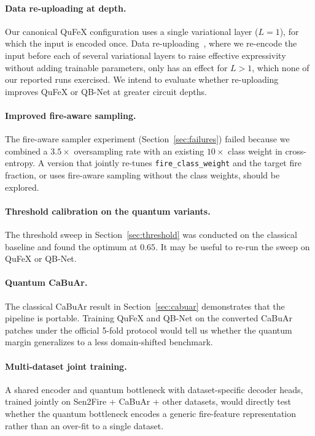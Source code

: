\documentclass{article}
\begin{document}
\paragraph{Data re-uploading at depth.} Our canonical QuFeX configuration uses a single variational layer ($L=1$), for which the input is encoded once. Data re-uploading~\cite{data-reuploading}, where we re-encode the input before each of several variational layers to raise effective expressivity without adding trainable parameters, only has an effect for $L>1$, which none of our reported runs exercised. We intend to evaluate whether re-uploading improves QuFeX or QB-Net at greater circuit depths.

\paragraph{Improved fire-aware sampling.} The fire-aware sampler experiment (Section~\ref{sec:failures}) failed because we combined a $3.5\times$ oversampling rate with an existing $10\times$ class weight in cross-entropy. A version that jointly re-tunes \texttt{fire\_class\_weight} and the target fire fraction, or uses fire-aware sampling without the class weights, should be explored.

\paragraph{Threshold calibration on the quantum variants.} The threshold sweep in Section~\ref{sec:threshold} was conducted on the classical baseline and found the optimum at $0.65$. It may be useful to re-run the sweep on QuFeX or QB-Net.

\paragraph{Quantum CaBuAr.} The classical CaBuAr result in Section~\ref{sec:cabuar} demonstrates that the pipeline is portable. Training QuFeX and QB-Net on the converted CaBuAr patches under the official 5-fold protocol would tell us whether the quantum margin generalizes to a less domain-shifted benchmark.

\paragraph{Multi-dataset joint training.} A shared encoder and quantum bottleneck with dataset-specific decoder heads, trained jointly on Sen2Fire + CaBuAr + other datasets, would directly test whether the quantum bottleneck encodes a generic fire-feature representation rather than an over-fit to a single dataset.
\end{document}
